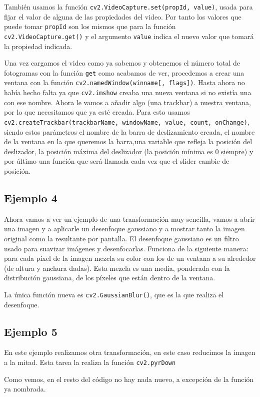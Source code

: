 \documentclass[a4paper,openright, 12pt]{book}
\begin{document}
También usamos la función \lstinline|cv2.VideoCapture.set(propId, value)|, usada para fijar el valor de alguna de las propiedades del video. Por tanto los valores que puede tomar \lstinline|propId| son los mismos que para la función \lstinline|cv2.VideoCapture.get()| y el argumento \lstinline|value| indica el nuevo valor que tomará la propiedad indicada.

Una vez cargamos el video como ya sabemos y obtenemos el número total de fotogramas con la función \lstinline|get| como acabamos de ver, procedemos a crear una ventana con la función \lstinline|cv2.namedWindow(winname[, flags])|.
Hasta ahora no había hecho falta ya que \lstinline|cv2.imshow| creaba una nueva ventana si no existía una con ese nombre.
Ahora le vamos a añadir algo (una trackbar) a nuestra ventana, por lo que necesitamos que ya esté creada.
Para esto usamos \lstinline|cv2.createTrackbar(trackbarName, windowName, value, count, onChange)|, siendo estos parámetros el nombre de la barra de deslizamiento creada, el nombre de la ventana en la que queremos la barra,una variable que refleja la posición del deslizador, la posición máxima del deslizador (la posición mínima es 0 siempre) y por último una función que será llamada cada vez que el slider cambie de posición.

\newpage

\subsection*{Ejemplo 4}
Ahora vamos a ver un ejemplo de una transformación muy sencilla, vamos a abrir una imagen y a aplicarle un desenfoque gaussiano y a mostrar tanto la imagen original como la resultante por pantalla. El desenfoque gaussiano es un filtro usado para suavizar imágenes y desenfocarlas. Funciona de la siguiente manera: para cada píxel de la imagen mezcla su color con los de un ventana a su alrededor (de altura y anchura dadas). Esta mezcla es una media, ponderada con la distribución gaussiana, de los píxeles que están dentro de la ventana.

La única función nueva es 
\lstinline|cv2.GaussianBlur()|, que es la que realiza el desenfoque.




\newpage

\subsection*{Ejemplo 5}
En este ejemplo realizamos otra transformación, en este caso reducimos la imagen a la mitad. Esta tarea la realiza la función \lstinline|cv2.pyrDown|

Como vemos, en el resto del código no hay nada nuevo, a excepción de la función ya nombrada.
\newpage
\end{document}
